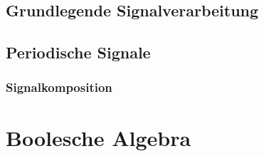 \documentclass[numbers=endperiod]{scrartcl}
\begin{document}
\subsection{Grundlegende Signalverarbeitung}
\subsection{Periodische Signale}

\subsubsection{Signalkomposition}

\section{Boolesche Algebra}
\end{document}
